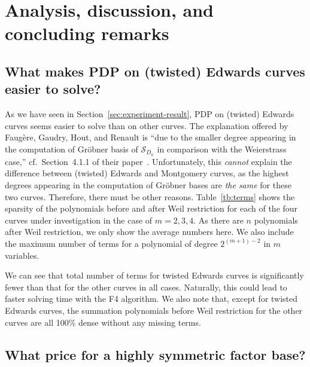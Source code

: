 
\section{Analysis, discussion, and concluding remarks}
\label{sec:analysis}

\subsection{What makes PDP on (twisted) Edwards curves easier to
  solve?}

As we have seen in Section~\ref{sec:experiment-result}, PDP on
(twisted) Edwards curves seems easier to solve than on other curves.
%
The explanation offered by Faug\`ere, Gaudry, Hout, and Renault is
``due to the smaller degree appearing in the computation of Gr\"obner
basis of $\mathscr S_{D_n}$ in comparison with the Weierstrass case,''
cf.~Section~4.1.1 of their
paper~\cite{DBLP:journals/joc/FaugereGHR14}.
%
Unfortunately, this \emph{cannot} explain the difference between
(twisted) Edwards and Montgomery curves, as the highest degrees
appearing in the computation of Gr\"obner bases are \emph{the same}
for these two curves.
%
Therefore, there must be other reasons.
%
Table~\ref{tb:terms} shows the sparsity of the polynomials before and
after Weil restriction for each of the four curves under investigation
in the case of $m=2,3,4$.
%
As there are $n$ polynomials after Weil restriction, we only show the
average numbers here.
%
We also include the maximum number of terms for a polynomial of degree
$2^{(m+1)-2}$ in $m$ variables.
%


We can see that total number of terms for twisted Edwards curves is
significantly fewer than that for the other curves in all cases.
%
Naturally, this could lead to faster solving time with the F4
algorithm.
%
We also note that, except for twisted Edwards curves, the summation
polynomials before Weil restriction for the other curves are all 100\%
dense without any missing terms.





\subsection{What price for a highly symmetric factor base?}
\label{sec:price}

